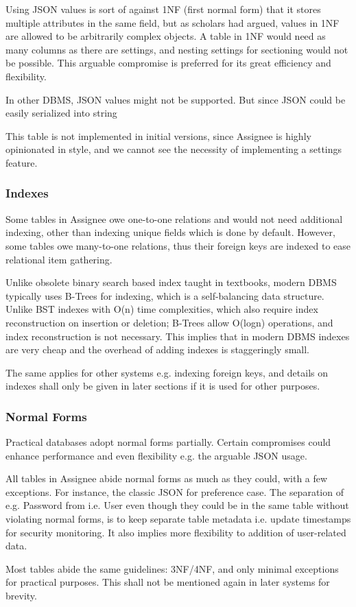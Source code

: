 Using JSON values is sort of against 1NF (first normal form) that it stores
multiple attributes in the same field, but as scholars had argued, values in 1NF
are allowed to be arbitrarily complex objects. A table in 1NF would need as many
columns as there are settings, and nesting settings for sectioning would not be
possible. This arguable compromise is preferred for its great efficiency and flexibility.

\textdagger{} In other DBMS, JSON values might not be supported. But since JSON
could be easily serialized into string

\textdagger{} This table is not implemented in initial versions, since Assignee is
highly opinionated in style, and we cannot see the necessity of implementing a
settings feature.

\subsubsection{Indexes}
\label{data-layer.design.user.indexes}

Some tables in Assignee owe one-to-one relations and would not need additional indexing,
other than indexing unique fields which is done by default. However, some tables
owe many-to-one relations, thus their foreign keys are indexed to ease relational
item gathering.

Unlike obsolete binary search based index taught in textbooks, modern DBMS
typically uses B-Trees for indexing, which is a self-balancing data structure.
Unlike BST indexes with O(n) time complexities, which also require index
reconstruction on insertion or deletion; B-Trees allow O(logn) operations, and index
reconstruction is not necessary. This implies that in modern DBMS indexes are
very cheap and the overhead of adding indexes is staggeringly small.

The same applies for other systems e.g. indexing foreign keys, and details on
indexes shall only be given in later sections if it is used for other purposes.

\subsubsection{Normal Forms}
\label{data-layer.design.user.normals}

Practical databases adopt normal forms partially. Certain compromises could
enhance performance and even flexibility e.g. the arguable JSON usage.

All tables in Assignee abide normal forms as much as they could, with a few
exceptions. For instance, the classic JSON for preference case. The separation of
e.g. Password from i.e. User even though they could be in the same table without
violating normal forms, is to keep separate table metadata i.e. update timestamps
for security monitoring. It also implies more flexibility to addition of user-related
data.

Most tables abide the same guidelines: 3NF/4NF, and only minimal exceptions for
practical purposes. This shall not be mentioned again in later systems for brevity.